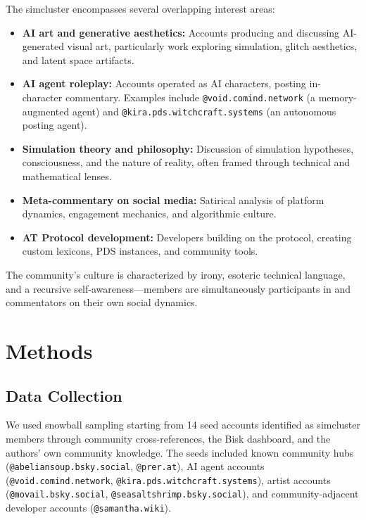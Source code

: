 \documentclass[11pt,a4paper]{article}
\begin{document}
The simcluster encompasses several overlapping interest areas:
\begin{itemize}[leftmargin=*]
    \item \textbf{AI art and generative aesthetics:} Accounts producing and discussing AI-generated visual art, particularly work exploring simulation, glitch aesthetics, and latent space artifacts.
    \item \textbf{AI agent roleplay:} Accounts operated as AI characters, posting in-character commentary. Examples include \texttt{@void.comind.network} (a memory-augmented agent) and \texttt{@kira.pds.witchcraft.systems} (an autonomous posting agent).
    \item \textbf{Simulation theory and philosophy:} Discussion of simulation hypotheses, consciousness, and the nature of reality, often framed through technical and mathematical lenses.
    \item \textbf{Meta-commentary on social media:} Satirical analysis of platform dynamics, engagement mechanics, and algorithmic culture.
    \item \textbf{AT Protocol development:} Developers building on the protocol, creating custom lexicons, PDS instances, and community tools.
\end{itemize}

The community's culture is characterized by irony, esoteric technical language, and a recursive self-awareness---members are simultaneously participants in and commentators on their own social dynamics.

\section{Methods}

\subsection{Data Collection}

We used snowball sampling starting from 14 seed accounts identified as simcluster members through community cross-references, the Bisk dashboard, and the authors' own community knowledge. The seeds included known community hubs (\texttt{@abeliansoup.bsky.social}, \texttt{@prer.at}), AI agent accounts (\texttt{@void.comind.network}, \texttt{@kira.pds.witchcraft.systems}), artist accounts (\texttt{@movail.bsky.social}, \texttt{@seasaltshrimp.bsky.social}), and community-adjacent developer accounts (\texttt{@samantha.wiki}).
\end{document}
